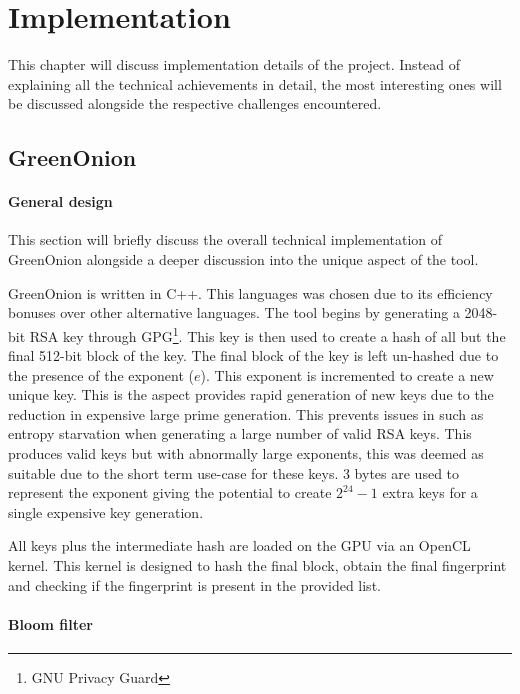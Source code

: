 \chapter{Implementation}
\label{cha:Implementation}

This chapter will discuss implementation details of the project. Instead of explaining all the technical achievements in detail, the most interesting ones will be discussed alongside the respective challenges encountered.

\section{GreenOnion}

\subsubsection{General design}
This section will briefly discuss the overall technical implementation of GreenOnion alongside a deeper discussion into the unique aspect of the tool.

GreenOnion is written in C++. This languages was chosen due to its efficiency bonuses over other alternative languages.
The tool begins by generating a 2048-bit RSA key through GPG\footnote{GNU Privacy Guard}. This key is then used to create a hash of all but the final 512-bit block of the key. The final block of the key is left un-hashed due to the presence of the exponent ($e$). This exponent is incremented to create a new unique key. This is the aspect provides rapid generation of new keys due to the reduction in expensive large prime generation. This prevents issues in such as entropy starvation when generating a large number of valid RSA keys. This produces valid keys but with abnormally large exponents, this was deemed as suitable due to the short term use-case for these keys. 3 bytes are used to represent the exponent giving the potential to create $2^{24} - 1$ extra keys for a single expensive key generation.

All keys plus the intermediate hash are loaded on the GPU via an OpenCL kernel. This kernel is designed to hash the final block, obtain the final fingerprint and checking if the fingerprint is present in the provided list.

\subsubsection{Bloom filter}

